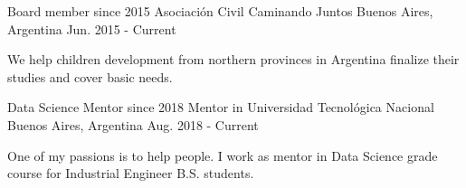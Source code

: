 

\begin{cventries}

  \cventry
    {Board member since 2015} %
    {Asociación Civil Caminando Juntos} %
    {Buenos Aires, Argentina} %
    {Jun. 2015 - Current} %
    {
      \begin{cvitems} %
        \item {We help children development from northern provinces in Argentina finalize their studies and cover basic needs.}
      \end{cvitems}
    }

  \cventry
    {Data Science Mentor since 2018} %
    {Mentor in Universidad Tecnológica Nacional} %
    {Buenos Aires, Argentina} %
    {Aug. 2018 - Current} %
    {
      \begin{cvitems} %
        \item {One of my passions is to help people. I work as mentor in Data Science grade course for Industrial Engineer B.S. students.}
      \end{cvitems}
    }

\end{cventries}
